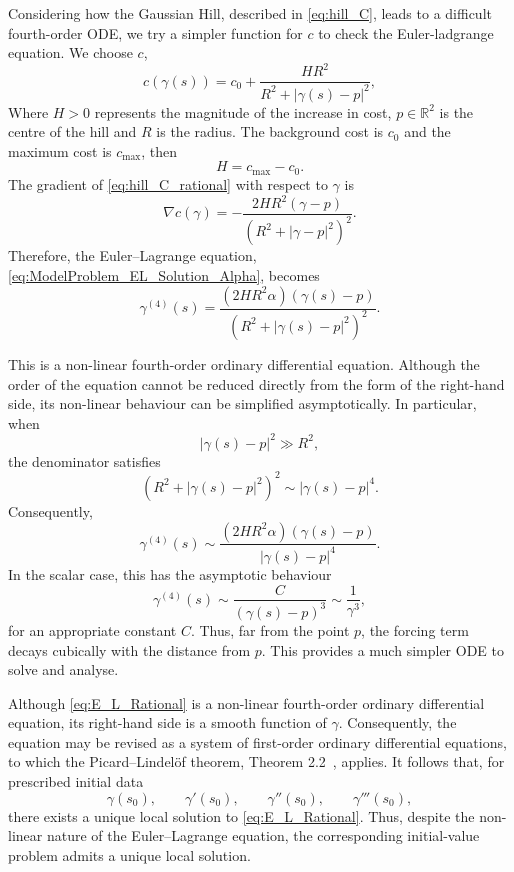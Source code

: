 Considering how the Gaussian Hill, described in \eqref{eq:hill_C}, leads to a difficult fourth-order ODE, we try a simpler function for $c$ to check the Euler-ladgrange equation. We choose $c$, 
\begin{equation}
\label{eq:hill_C_rational}
c(\gamma(s)) = 
c_0+
\frac{H R^2}
{R^2+\left|\gamma(s)-p\right|^2},
\end{equation}
Where $H>0$ represents the magnitude of the increase in cost, $p\in\mathbb{R}^2$ is the centre of the hill and $R$ is the radius. The background cost is $c_0$ and the maximum cost is $c_{\max}$, then
$$
H=c_{\max}-c_0.
$$ 
The gradient of \eqref{eq:hill_C_rational} with respect to $\gamma$ is
$$
\nabla c(\gamma)
=
-\frac{2HR^2(\gamma-p)}
{\left(R^2+\left|\gamma-p\right|^2\right)^2}.
$$
Therefore, the Euler--Lagrange equation, \eqref{eq:ModelProblem_EL_Solution_Alpha}, becomes
\begin{equation}
\label{eq:E_L_Rational}
\gamma^{(4)}(s)=
\frac{(2HR^2\alpha)(\gamma(s)-p)}
{\left(R^2+\left|\gamma(s)-p\right|^2\right)^2}.
\end{equation}

This is a non-linear fourth-order ordinary differential equation. Although the order of the equation cannot be reduced directly from the form of the right-hand side, its non-linear behaviour can be simplified asymptotically. In particular, when
$$
\left|\gamma(s)-p\right|^2 \gg R^2,
$$
the denominator satisfies
$$
\left(R^2+\left|\gamma(s)-p\right|^2\right)^2
\sim
\left|\gamma(s)-p\right|^4.
$$
Consequently,
$$
\gamma^{(4)}(s)
\sim
\frac{(2HR^2\alpha)(\gamma(s)-p)}
{\left|\gamma(s)-p\right|^4}.
$$
In the scalar case, this has the asymptotic behaviour
$$
\gamma^{(4)}(s)
\sim
\frac{C}{\left(\gamma(s)-p\right)^3} \sim \frac{1}{\gamma^3},
$$
for an appropriate constant \(C\). Thus, far from the point \(p\), the forcing term decays cubically with the distance from \(p\). This provides a much simpler ODE to solve and analyse. 

Although \eqref{eq:E_L_Rational} is a non-linear fourth-order ordinary differential equation, its right-hand side is a smooth function of \(\gamma\). Consequently, the equation may be revised as a system of first-order ordinary differential equations, to which the Picard--Lindelöf theorem, Theorem 2.2~\cite{teschl2012ordinary}, applies. It follows that, for prescribed initial data
$$
\gamma(s_0),\qquad \gamma'(s_0),\qquad \gamma''(s_0),\qquad \gamma'''(s_0),
$$
there exists a unique local solution to \eqref{eq:E_L_Rational}. Thus, despite the non-linear nature of the Euler--Lagrange equation, the corresponding initial-value problem admits a unique local solution.

